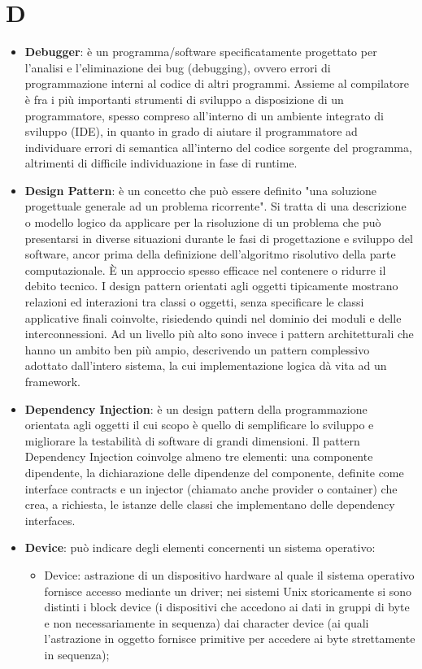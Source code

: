 \section{D}
\begin{itemize} 
	\item
	\textbf{Debugger}: è un programma/software specificatamente progettato per l'analisi e l'eliminazione dei bug (debugging), ovvero errori di programmazione interni al codice di altri programmi. Assieme al compilatore è fra i più importanti strumenti di sviluppo a disposizione di un programmatore, spesso compreso all'interno di un ambiente integrato di sviluppo (IDE), in quanto in grado di aiutare il programmatore ad individuare errori di semantica all'interno del codice sorgente del programma, altrimenti di difficile individuazione in fase di runtime.
	\item
	\textbf{Design Pattern}: è un concetto che può essere definito "una soluzione progettuale generale ad un problema ricorrente". Si tratta di una descrizione o modello logico da applicare per la risoluzione di un problema che può presentarsi in diverse situazioni durante le fasi di progettazione e sviluppo del software, ancor prima della definizione dell'algoritmo risolutivo della parte computazionale. È un approccio spesso efficace nel contenere o ridurre il debito tecnico.
	I design pattern orientati agli oggetti tipicamente mostrano relazioni ed interazioni tra classi o oggetti, senza specificare le classi applicative finali coinvolte, risiedendo quindi nel dominio dei moduli e delle interconnessioni. Ad un livello più alto sono invece i pattern architetturali che hanno un ambito ben più ampio, descrivendo un pattern complessivo adottato dall'intero sistema, la cui implementazione logica dà vita ad un framework.
	\item
	\textbf{Dependency Injection}: è un design pattern della programmazione orientata agli oggetti il cui scopo è quello di semplificare lo sviluppo e migliorare la testabilità di software di grandi dimensioni. Il pattern Dependency Injection coinvolge almeno tre elementi: una componente dipendente, la dichiarazione delle dipendenze del componente, definite come interface contracts e un injector (chiamato anche provider o container) che crea, a richiesta, le istanze delle classi che implementano delle dependency interfaces.
	\item
	\textbf{Device}: può indicare degli elementi concernenti un sistema operativo:
	 \begin{itemize} 
	\item Device: astrazione di un dispositivo hardware al quale il sistema operativo fornisce accesso mediante un driver; nei sistemi Unix storicamente si sono distinti i block device (i dispositivi che accedono ai dati in gruppi di byte e non necessariamente in sequenza) dai character device (ai quali l'astrazione in oggetto fornisce primitive per accedere ai byte strettamente in sequenza);

\end{itemize}
\end{itemize}
